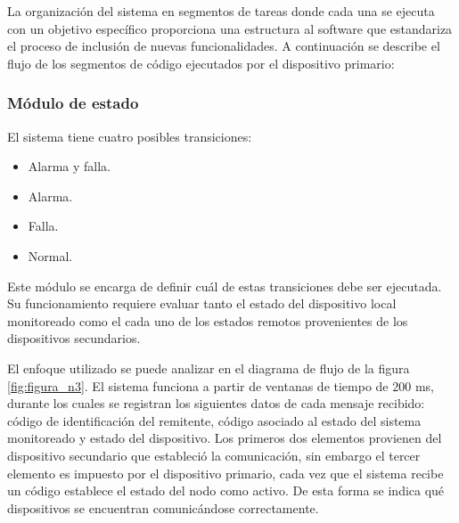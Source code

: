 La organización del sistema en segmentos de tareas donde cada una se ejecuta con un objetivo específico proporciona una estructura al software que estandariza el proceso de inclusión de nuevas funcionalidades.  A continuación se describe el flujo de los segmentos de código ejecutados por el dispositivo primario:

\subsubsection{Módulo de estado}

El sistema tiene cuatro posibles transiciones:
\begin{itemize}
\item Alarma y falla.
\item Alarma.
\item Falla.
\item Normal.  
\end{itemize}

Este módulo se encarga de definir cuál de estas transiciones debe ser ejecutada. Su funcionamiento requiere evaluar tanto el estado del dispositivo local monitoreado como el cada uno de los estados remotos provenientes de los dispositivos secundarios.

El enfoque utilizado se puede analizar en el diagrama de flujo de la figura \ref{fig:figura_n3}. El sistema funciona a partir de ventanas de tiempo de 200 ms, durante los cuales se registran los siguientes datos de cada mensaje recibido: código de identificación del remitente, código asociado al estado del sistema monitoreado y estado del dispositivo. Los primeros dos elementos provienen del dispositivo secundario que estableció la comunicación, sin embargo el tercer elemento es impuesto por el dispositivo primario, cada vez que el sistema recibe un código establece el estado del nodo como activo. De esta forma se indica qué dispositivos se encuentran comunicándose correctamente.

